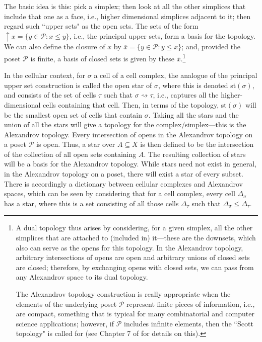 \documentclass[11pt]{book}
\theoremstyle{definition}
\theoremstyle{definition}
\theoremstyle{definition}
\theoremstyle{theorem}
\theoremstyle{definition}
\begin{document}
The basic idea is this: pick a simplex; then look at all the other simplices that include that one as a face, i.e., higher dimensional simplices adjacent to it; then regard such ``upper sets" as the open sets. The sets of the form $\uparrow x = \{y \in \mathcal{P}: x \leq y \}$, i.e., the principal upper sets, form a basis for the topology. We can also define the closure of $x$ by $\overline{x} = \{y \in \mathcal{P}: y \leq x \}$; and, provided the poset $\mathcal{P}$ is finite, a basis of closed sets is given by these $\overline{x}$.\footnote{A dual topology thus arises by considering, for a given simplex, all the other simplices that are attached to (included in) it---these are the downsets, which also can serve as the opens for this topology. In the Alexandrov topology, arbitrary intersections of opens are open and arbitrary unions of closed sets are closed; therefore, by exchanging opens with closed sets, we can pass from any Alexandrov space to its dual topology. \par The Alexandrov topology construction is really appropriate when the elements of the underlying poset $\mathcal{P}$ represent finite pieces of information, i.e., are compact, something that is typical for many combinatorial and computer science applications; however, if $\mathcal{P}$ includes infinite elements, then the ``Scott topology" is called for (see Chapter 7 of \cite{vickers_topology_1996} for details on this).} \par 
In the cellular context, for $\sigma$ a cell of a cell complex, the analogue of the principal upper set construction is called the open star of $\sigma$, where this is denoted st$(\sigma)$, and consists of the set of cells $\tau$ such that $\sigma \rightsquigarrow \tau$, i.e., captures all the higher-dimensional cells containing that cell. Then, in terms of the topology, st$(\sigma)$ will be the smallest open set of cells that contain $\sigma$. Taking all the stars and the union of all the stars will give a topology for the complex/simplex---this is the Alexandrov topology. Every intersection of opens in the Alexandrov topology on a poset $\mathcal{P}$ is open. Thus, a star over $A \subseteq  X$ is then defined to be the intersection of the collection of all open sets containing $A$. The resulting collection of stars will be a basis for the Alexandrov topology.  While stars need not exist in general, in the Alexandrov topology on a poset, there will exist a star of every subset. There is accordingly a dictionary between cellular complexes and Alexandrov spaces, which can be seen by considering that for a cell complex, every cell $\Delta_{\sigma}$ has a star, where this is a set consisting of all those cells $\Delta_{\tau}$ such that $\Delta_{\sigma} \leq \Delta_{\tau}$. \par 
\end{document}
